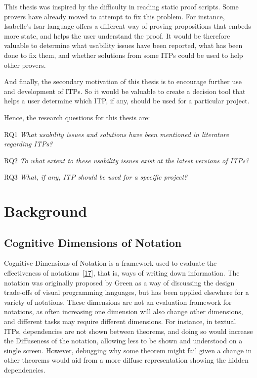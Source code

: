 \documentclass[
]{article}
\begin{document}
This thesis was inspired by the difficulty in reading static proof
scripts. Some provers have already moved to attempt to fix this problem.
For instance, Isabelle's Isar language offers a different way of proving
propositions that embeds more state, and helps the user understand the
proof. It would be therefore valuable to determine what usability issues
have been reported, what has been done to fix them, and whether
solutions from some ITPs could be used to help other provers.

And finally, the secondary motivation of this thesis is to encourage
further use and development of ITPs. So it would be valuable to create a
decision tool that helps a user determine which ITP, if any, should be
used for a particular project.

Hence, the research questions for this thesis are:

RQ1 \emph{What usability issues and solutions have been mentioned in
literature regarding ITPs?}

RQ2 \emph{To what extent to these usability issues exist at the latest
versions of ITPs?}

RQ3 \emph{What, if any, ITP should be used for a specific project?}

\hypertarget{background}{%
\section{Background}\label{background}}

\hypertarget{cognitive-dimensions-of-notation}{%
\subsection{Cognitive Dimensions of
Notation}\label{cognitive-dimensions-of-notation}}

Cognitive Dimensions of Notation is a framework used to evaluate the
effectiveness of
notations~{[}\protect\hyperlink{ref-green_usability_1996}{17}{]}, that
is, ways of writing down information. The notation was originally
proposed by Green as a way of discussing the design trade-offs of visual
programming languages, but has been applied elsewhere for a variety of
notations. These dimensions are not an evaluation framework for
notations, as often increasing one dimension will also change other
dimensions, and different tasks may require different dimensions. For
instance, in textual ITPs, dependencies are not shown between theorems,
and doing so would increase the Diffuseness of the notation, allowing
less to be shown and understood on a single screen. However, debugging
why some theorem might fail given a change in other theorems would aid
from a more diffuse representation showing the hidden dependencies.
\end{document}
